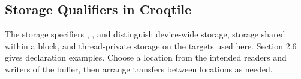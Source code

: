 \subsection*{Storage Qualifiers in Croqtile}

The storage specifiers \co@global@, \co@shared@, and \co@local@ distinguish device-wide storage, storage shared within a block, and thread-private storage on the targets used here. Section 2.6 gives declaration examples. Choose a location from the intended readers and writers of the buffer, then arrange transfers between locations as needed.
